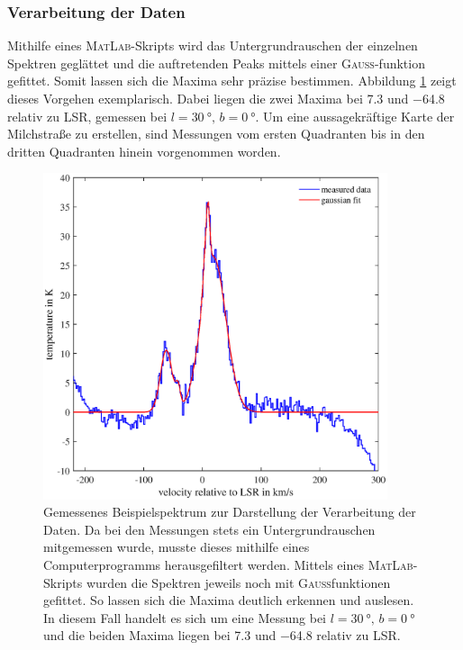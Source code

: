 \subsubsection{Verarbeitung der Daten}
Mithilfe eines \textsc{MatLab}-Skripts wird das Untergrundrauschen der einzelnen Spektren geglättet und die auftretenden Peaks mittels einer \textsc{Gauß}-funktion gefittet. 
Somit lassen sich die Maxima sehr präzise bestimmen. 
Abbildung \ref{fig:TestBaseline} zeigt dieses Vorgehen exemplarisch. 
Dabei liegen die zwei Maxima bei \SI{7.3}{} und \SI{-64.8}{} relativ zu LSR, gemessen bei $l = \SI{30}{\degree}, \, b = \SI{0}{\degree}$. 
Um eine aussagekräftige Karte der Milchstraße zu erstellen, sind Messungen vom ersten Quadranten bis in den dritten Quadranten hinein vorgenommen worden.
\begin{figure}[H]
    \centering
    \includegraphics[width= 0.9\textwidth]{plots/TestBaseline.eps}
    \caption[Gemessenes Beispielspektrum zur Darstellung der Verarbeitung der Daten]{Gemessenes Beispielspektrum zur Darstellung der Verarbeitung der Daten. Da bei den Messungen stets ein Untergrundrauschen mitgemessen wurde, musste dieses mithilfe eines Computerprogramms herausgefiltert werden. Mittels eines \textsc{MatLab}-Skripts wurden die Spektren jeweils noch mit \textsc{Gauß}funktionen gefittet. So lassen sich die Maxima deutlich erkennen und auslesen. In diesem Fall handelt es sich um eine Messung bei $l = \SI{30}{\degree}, \, b = \SI{0}{\degree}$ und die beiden Maxima liegen bei \SI{7.3}{} und \SI{-64.8}{} relativ zu LSR.}
    \label{fig:TestBaseline}
\end{figure}
